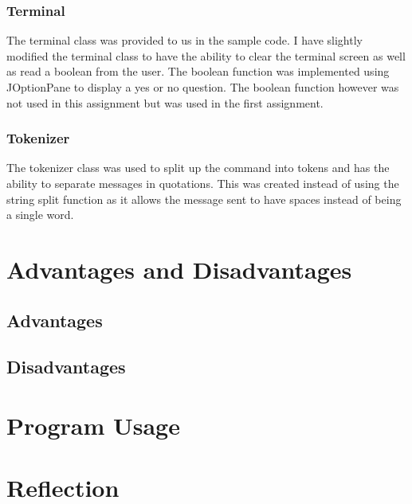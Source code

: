 \documentclass{article}
\begin{document}
\subsubsection{Terminal}
The terminal class was provided to us in the sample code. I have slightly
modified the terminal class to have the ability to clear the terminal screen
as well as read a boolean from the user. The boolean function was implemented
using JOptionPane to display a yes or no question. The boolean function however
was not used in this assignment but was used in the first assignment.

\subsubsection{Tokenizer}
The tokenizer class was used to split up the command into tokens and has the
ability to separate messages in quotations. This was created instead of using
the string split function as it allows the message sent to have spaces instead
of being a single word.

\section{Advantages and Disadvantages}
\subsection{Advantages}

\subsection{Disadvantages}

\section{Program Usage}

\section{Reflection}
\end{document}
